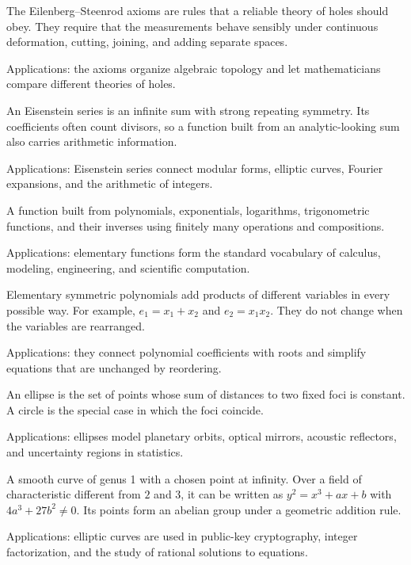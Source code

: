 The Eilenberg--Steenrod axioms are rules that a reliable theory of holes should obey. They require that the measurements behave sensibly under continuous deformation, cutting, joining, and adding separate spaces.  \par\noindent Applications: the axioms organize algebraic topology and let mathematicians compare different theories of holes.

An Eisenstein series is an infinite sum with strong repeating symmetry. Its coefficients often count divisors, so a function built from an analytic-looking sum also carries arithmetic information.  \par\noindent Applications: Eisenstein series connect modular forms, elliptic curves, Fourier expansions, and the arithmetic of integers.

A function built from polynomials, exponentials, logarithms, trigonometric functions, and their inverses using finitely many operations and compositions. \par\noindent Applications: elementary functions form the standard vocabulary of calculus, modeling, engineering, and scientific computation.

Elementary symmetric polynomials add products of different variables in every possible way. For example, $e_1=x_1+x_2$ and $e_2=x_1x_2$. They do not change when the variables are rearranged. \par\noindent Applications: they connect polynomial coefficients with roots and simplify equations that are unchanged by reordering.

An ellipse is the set of points whose sum of distances to two fixed foci is constant. A circle is the special case in which the foci coincide. \par\noindent Applications: ellipses model planetary orbits, optical mirrors, acoustic reflectors, and uncertainty regions in statistics.

A smooth curve of genus 1 with a chosen point at infinity. Over a field of characteristic different from $2$ and $3$, it can be written as $y^2=x^3+ax+b$ with $4a^3+27b^2\ne0$. Its points form an abelian group under a geometric addition rule. \par\noindent Applications: elliptic curves are used in public-key cryptography, integer factorization, and the study of rational solutions to equations.

